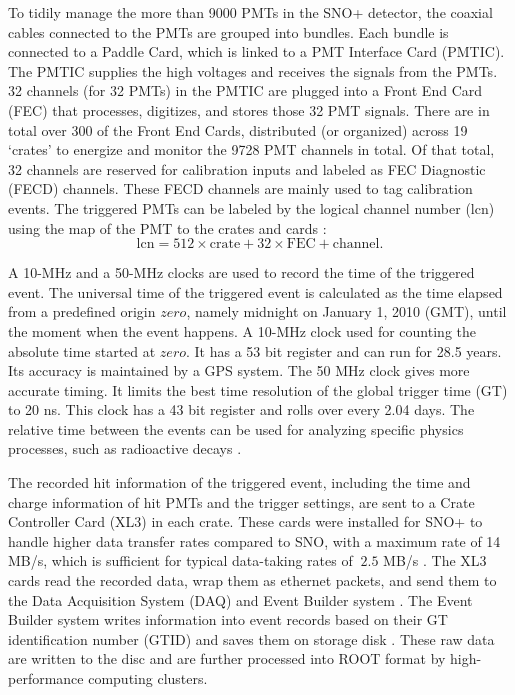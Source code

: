 To tidily manage the more than 9000 PMTs in the SNO+ detector, the coaxial cables connected to the PMTs are grouped into bundles. Each bundle is connected to a Paddle Card, which is linked to a PMT Interface Card (PMTIC). The PMTIC supplies the high voltages and receives the signals from the PMTs. 32 channels (for 32 PMTs) in the PMTIC are plugged into a Front End Card (FEC) that processes, digitizes, and stores those 32 PMT signals. There are in total over 300 of the Front End Cards, distributed (or organized) across 19 `crates' to energize and monitor the 9728 PMT channels in total. Of that total, 32 channels are reserved for calibration inputs and labeled as FEC Diagnostic (FECD) channels. These FECD channels are mainly used to tag calibration events. The triggered PMTs can be labeled by the logical channel number (lcn) using the map of the PMT to the crates and cards \cite{snop_jinst,stringer2019sensitivity}:
\begin{equation}
\mathrm{lcn = 512 \times crate + 32 \times FEC + channel}.
\end{equation}

A 10-MHz and a 50-MHz clocks are used to record the time of the triggered event. The universal time of the triggered event is calculated as the time elapsed from a predefined origin $zero$, namely midnight on January 1, 2010 (GMT), until the moment when the event happens. A 10-MHz clock used for counting the absolute time started at $zero$. It has a 53 bit register and can run for 28.5 years. Its accuracy is maintained by a GPS system. The 50 MHz clock gives more accurate timing. It limits the best time resolution of the global trigger time (GT) to 20 ns. This clock has a 43 bit register and rolls over every 2.04 days. The relative time between the events can be used for analyzing specific physics processes, such as radioactive decays \cite{rattime,stringer2019sensitivity}. 

The recorded hit information of the triggered event, including the time and charge information of hit PMTs and the trigger settings, are sent to a Crate Controller Card (XL3) in each crate. These cards were installed for SNO+ to handle higher data transfer rates compared to SNO, with a maximum rate of 14 MB/s, which is sufficient for typical data-taking rates of $~2.5$ MB/s \cite{bonventre2014neutron,rumleskie2021sno+}. The XL3 cards read the recorded data, wrap them as ethernet packets, and send them to the Data Acquisition System (DAQ) and Event Builder system \cite{walker2016study}. The Event Builder system writes information into event records based on their GT identification number (GTID) and saves them on storage disk \cite{snop_jinst}. These raw data are written to the disc and are further processed into ROOT format by high-performance computing clusters.

